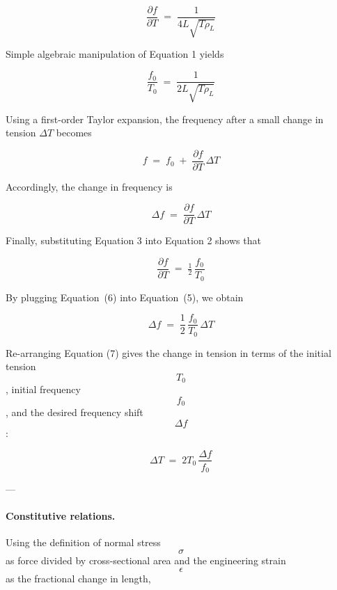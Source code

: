 \documentclass[12pt]{article}
\theoremstyle{definition} %
\theoremstyle{plain} %
\begin{document}
\begin{equation}
  \frac{\partial f}{\partial T}
    \;=\;
  \frac{1}{4L\sqrt{T\rho_L}}
  \tag{2}
\end{equation}

Simple algebraic manipulation of Equation 1 yields

\begin{equation}
  \frac{f_0}{T_0}
    \;=\;
  \frac{1}{2L\sqrt{T\rho_L}}
  \tag{3}
\end{equation}

Using a first-order Taylor expansion, the frequency after a small change
in tension $\Delta T$ becomes

\begin{equation}
  f \;=\; f_0 \;+\;
       \frac{\partial f}{\partial T}\,\Delta T
  \tag{4}
\end{equation}

Accordingly, the change in frequency is

\begin{equation}
  \Delta f
    \;=\;
  \frac{\partial f}{\partial T}\,\Delta T
  \tag{5}
\end{equation}

Finally, substituting Equation 3 into Equation 2 shows that

\begin{equation}
  \frac{\partial f}{\partial T}
    \;=\;
  \tfrac12\,\frac{f_0}{T_0}
  \tag{6}
\end{equation}


By plugging Equation~(6) into Equation~(5), we obtain

\begin{equation}
  \Delta f \;=\; \frac{1}{2}\,\frac{f_0}{T_0}\,\Delta T
  \tag{7}
\end{equation}

Re-arranging Equation (7) gives the change in tension in terms of the
initial tension $$T_0$$, initial frequency $$f_0$$, and the desired
frequency shift $$\Delta f$$:

\begin{equation}
  \Delta T \;=\; 2T_0\,\frac{\Delta f}{f_0}
  \tag{8}
\end{equation}

---

\paragraph*{Constitutive relations.}
Using the definition of normal stress $$\sigma$$ as force divided by
cross-sectional area and the engineering strain $$\epsilon$$ as the
fractional change in length,
\end{document}

